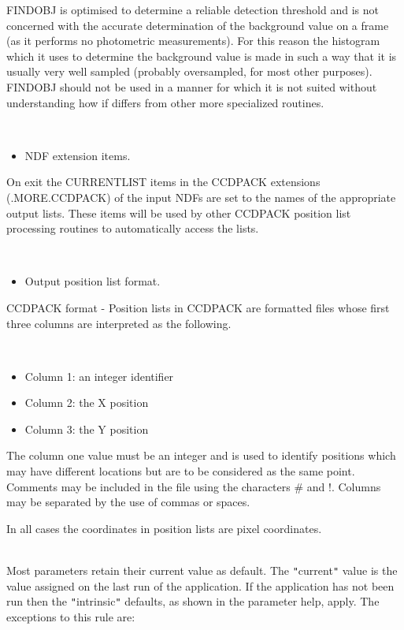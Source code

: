 \documentclass[twoside,11pt]{article}
\renewcommand{\_}{\texttt{\symbol{95}}}
\newcommand{\qt}[1]{{\tt "}#1{\tt "}}
\newcommand{\routine}[1]{{\sc #1}}
\newcommand{\sstdiytopic}[2]{\item[#1:] \mbox{} \\[1.3ex] #2}
\newcommand{\sstitemlist}[1]{
  \mbox{} \\
  \vspace{-3.5ex}
  \begin{itemize}
     #1
  \end{itemize}
}
\newcommand{\sstitem}{\item}
\newcommand{\sstdiytopic}[2]{\item[{#1}] #2 }
\newcommand{\sstitemlist}[1]{
      \begin{itemize}
         #1
      \end{itemize}
      \\
   }
\newcommand{\sstitem}{\item}
\begin{document}
{{        \routine{FINDOBJ} is optimised to determine a reliable detection threshold
        and is not concerned with the accurate determination of the
        background value on a frame (as it performs no photometric
        measurements). For this reason the histogram which it uses to
        determine the background value is made in such a way that it is
        usually very well sampled (probably oversampled, for most other
        purposes). \routine{FINDOBJ} should not be used in a manner for which it
        is not suited without understanding how if differs from other
        more specialized routines.

      \sstitemlist{

         \sstitem
         NDF extension items.

      }
        On exit the CURRENT\_LIST items in the CCDPACK extensions
        (.MORE.CCDPACK) of the input NDFs are set to the names of the
        appropriate output lists. These items will be used by other
        CCDPACK position list processing routines to automatically
        access the lists.

      \sstitemlist{

         \sstitem
         Output position list format.

      }
        CCDPACK format - Position lists in CCDPACK are formatted files
        whose first three columns are interpreted as the following.

      \sstitemlist{

         \sstitem
              Column 1: an integer identifier

         \sstitem
              Column 2: the X position

         \sstitem
              Column 3: the Y position

      }
        The column one value must be an integer and is used to identify
        positions which may have different locations but are to be
        considered as the same point. Comments may be included in the
        file using the characters \# and !. Columns may be separated by
        the use of commas or spaces.

        In all cases the coordinates in position lists are pixel 
        coordinates.
   }
   \sstdiytopic{
      Behaviour of parameters
   } {
      Most parameters retain their current value as default. The
      \qt{current} value is the value assigned on the last run of the
      application. If the application has not been run then the
      \qt{intrinsic} defaults, as shown in the parameter help, apply.
      The exceptions to this rule are:
      \sstitemlist{

}}}
\end{document}
